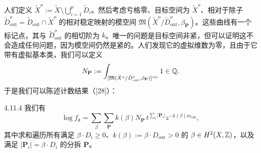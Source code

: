 人们定义 $\tilde X^{o}:=\tilde X\setminus\bigcup_{i=1}^{p}\tilde D_i$。然后考虑亏格零、目标空间为 $\tilde X^{o}$、相对于除子 $\tilde D^{o}_{\mathrm{out}}=\tilde D_{\mathrm{out}}\cap\tilde X^{o}$ 的相对稳定映射的模空间 $\mathfrak{M}(\tilde X^{o}/\tilde D^{o}_{\mathrm{out}},\beta_{\mathbf{P}})$。这些曲线有一个标记点，其与 $\tilde D^{o}_{\mathrm{out}}$ 的相切阶为 $k$。唯一的问题是目标空间非紧，但可以证明这不会造成任何问题，因为模空间仍然是紧的。人们发现它的虚拟维数为零，且由于它带有虚拟基本类，我们可以定义
\[
N_{\mathbf{P}}:=\int_{[\mathfrak{M}(\tilde X^{o}/\tilde D^{o}_{\mathrm{out}},\beta_{\mathbf{P}})]^{\mathrm{vir}}}1\in\mathbb{Q}.
\]
于是我们可以陈述计数结果（[28]）：

\begin{theorem}{4.11.4}
我们有
\[
\log f_\mathfrak{d}=\sum_{\beta}\sum_{\mathbf{P}}k(\beta)N_{\mathbf{P}}\,t^{\sum_i|\mathbf{P}_i|}z^{-k(\beta)m_{\mathrm{out}}},
\]
其中求和遍历所有满足 $\beta\cdot D_i\ge0$、$k(\beta):=\beta\cdot D_{\mathrm{out}}>0$ 的 $\beta\in H^2(X,\mathbb{Z})$，以及满足 $|\mathbf{P}_i|=\beta\cdot D_i$ 的分拆 $\mathbf{P}$。
\end{theorem}
